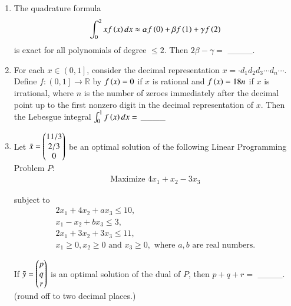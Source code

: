 \documentclass[journal]{IEEEtran}
\begin{document}
\begin{enumerate}
    \item The quadrature formula
        \begin{align*}
            \int_0^2 x f \left(x\right) dx \approx \alpha f \left(0\right) + \beta f \left(1\right) + \gamma f \left(2\right)
        \end{align*}
        is exact for all polynomials of degree $\leq 2$. Then $2\beta - \gamma =$ \_\_\_\_.

    \item For each $x \in\left( 0,1 \right]$, consider the decimal representation $x = \cdot d_1 d_2 d_3 \cdots d_n \cdots$. Define $f : \left( 0,1 \right] \rightarrow \mathbb{R}$ by $f\left(x\right) = 0$ if $x$ is rational and $f\left(x\right) = 18n$ if $x$ is irrational, where $n$ is the number of zeroes immediately after the decimal point up to the first nonzero digit in the decimal representation of $x$. Then the Lebesgue integral $\int_0^1 f \left(x\right) dx =$ \_\_\_\_

    \item \label{55} Let $\tilde{x} = \begin{pmatrix}11/3 \\ 2/3 \\ 0\end{pmatrix}$ be an optimal solution of the following Linear Programming Problem $P:$
        \begin{align*}
            \text{Maximize } 4x_1 + x_2 - 3x_3
        \end{align*}

        subject to
        \begin{align*}
            2x_1 + 4x_2 + a x_3 \leq 10,\\
            x_1 - x_2 + bx_3 \leq 3,\\
            2x_1 + 3x_2 + 3x_3 \leq 11,\\
            x_1 \geq 0, x_2 \geq 0 \text{ and } x_3 \geq 0, \text{ where } a,b \text{ are real numbers.}
        \end{align*}

        If $\tilde{y} = \begin{pmatrix}p\\q\\r\end{pmatrix}$ is an optimal solution of the dual of $P$, then $p+q+r=$ \_\_\_\_. (round off to two decimal places.)
\end{enumerate}



  
\end{document}
